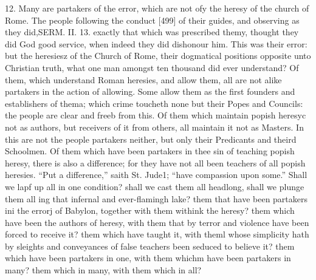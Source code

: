 12. Many are partakers of the error, which are not ofy the heresy of the church of Rome. The people following the conduct [499] of their guides, and observing as they did,SERM. II. 13. exactly that which was prescribed themy, thought they did God good service, when indeed they did dishonour him. This was their error: but the heresiesz of the Church of Rome, their dogmatical positions opposite unto Christian truth, what one man amongst ten thousand did ever understand? Of them, which understand Roman heresies, and allow them, all are not alike partakers in the action of allowing. Some allow them as the first founders and establishers of thema; which crime toucheth none but their Popes and Councils: the people are clear and freeb from this. Of them which maintain popish heresyc not as authors, but receivers of it from others, all maintain it not as Masters. In this are not the people partakers neither, but only their Predicants and theird Schoolmen. Of them which have been partakers in thee sin of teaching popish heresy, there is also a difference; for they have not all been teachers of all popish heresies. “Put a difference,” saith St. Jude1; “have compassion upon some.” Shall we lapf up all in one condition? shall we cast them all headlong, shall we plunge them all ing that infernal and ever-flamingh lake? them that have been partakers ini the errorj of Babylon, together with them withink the heresy? them which have been the authors of heresy, with them that by terror and violence have been forced to receive it? them which have taught it, with theml whose simplicity hath by sleights and conveyances of false teachers been seduced to believe it? them which have been partakers in one, with them whichm have been partakers in many? them which in many, with them which in all?


